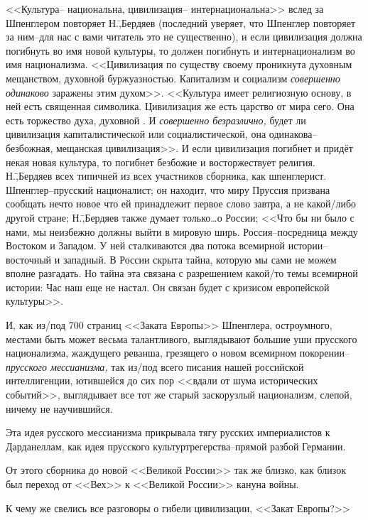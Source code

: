 <<Культура\--- национальна, цивилизация\--- интернациональна>> вслед за Шпенглером повторяет Н.\=,Бердяев (последний уверяет, что Шпенглер повторяет за ним\---для нас с вами читатель это не существенно), и если цивилизация должна погибнуть во имя новой культуры, то должен погибнуть и интернационализм во имя национализма. <<Цивилизация по существу своему проникнута духовным мещанством, духовной буржуазностью. Капитализм и социализм \emph{совершенно одинаково} заражены этим духом>>. <<Культура имеет религиозную основу, в ней есть священная символика. Цивилизация же есть царство от мира сего. Она есть торжество \grqq духа, духовной \grqq. И \emph{совершенно безразлично,} будет ли цивилизация капиталистической или социалистической, она одинакова\---безбожная, мещанская цивилизация>>. И если цивилизация погибнет и придёт некая новая культура, то погибнет безбожие и восторжествует религия. Н.\=,Бердяев всех типичней из всех участников сборника, как шпенглерист. Шпенглер\---прусский националист; он находит, что миру Пруссия призвана сообщать нечто новое что ей принадлежит первое слово завтра, а не какой\-/либо другой стране; Н.\=,Бердяев также думает только\dots о России; <<Что бы ни было с нами, мы неизбежно должны выйти в мировую ширь. Россия\---посредница между Востоком и Западом. У ней сталкиваются два потока всемирной истории\--- восточный и западный. В России скрыта тайна, которую мы сами не можем вполне разгадать. Но тайна эта связана с разрешением какой\-/то темы всемирной истории: Час наш еще не настал. Он связан будет с кризисом европейской культуры>>.

И, как из\-/под 700 страниц <<Заката Европы>> Шпенглера, остроумного, местами быть может весьма талантливого, выглядывают большие уши прусского национализма, жаждущего реванша, грезящего о новом всемирном покорении\---\emph{прусского мессианизма,} так из\-/под всего писания нашей российской интеллигенции, ютившейся до сих пор <<вдали от шума исторических событий>>, выглядывает все тот же старый заскорузлый национализм, слепой, ничему не научившийся.

Эта идея русского мессианизма прикрывала тягу русских империалистов к Дарданеллам, как идея прусского культуртрегерства\---прямой разбой Германии.

От этого сборника до новой <<Великой России>> так же близко, как близок был переход от <<Вех>> к <<Великой России>> кануна войны.

К чему же свелись все разговоры о гибели цивилизации, <<Закат Европы?>>


